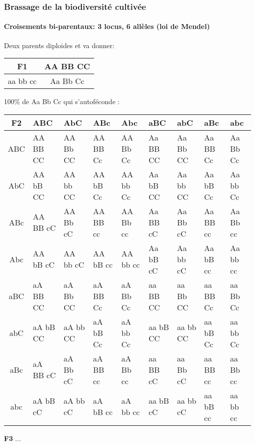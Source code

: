 \begin{frame}
\frametitle{Brassage de la biodiversité cultivée}
\framesubtitle{Croisements bi-parentaux: 3 locus, 6 allèles (loi de Mendel)}

\begin{center}

Deux parents diploides  et  va donner:

\begin{tabular}{|c|c|}
\hline
\textbf{F1} & AA BB CC \\
\hline
aa bb cc & Aa Bb Cc \\
\hline
\end{tabular}

\vspace{.5cm}

100\% de Aa Bb Cc qui s'autoféconde : \\

\tiny
\begin{tabular}{|
c|
p{}|
p{}|
p{}|
p{}|
p{}|
p{}|
p{}|
p{}|}
\hline
\textbf{\normalsize F2}& ABC & AbC & ABc & Abc & aBC & abC & aBc & abc \\
\hline
ABC & \cellcolor{mln-green} AA BB CC & AA Bb CC & AA BB Cc & AA Bb Cc & Aa BB CC & Aa Bb CC & Aa BB Cc & Aa Bb Cc \\
AbC & AA bB CC & AA bb CC & AA bB Cc & AA bb Cc & Aa bB CC & Aa bb CC & Aa bB Cc & Aa bb Cc \\
ABc & AA BB cC & AA Bb cC & AA BB cc & AA Bb cc & Aa BB cC & Aa Bb cC & Aa BB cc & Aa Bb cc \\
Abc & AA bB cC & AA bb cC & AA bB cc & AA bb cc & Aa bB cC & Aa bb cC & Aa bB cc & Aa bb cc \\
aBC & aA BB CC & aA Bb CC & aA BB Cc & aA Bb Cc & aa BB CC & aa Bb CC & aa BB Cc & aa Bb Cc \\
abC & aA bB CC & aA bb CC & aA bB Cc & aA bb Cc & aa bB CC & aa bb CC & aa bB Cc & aa bb Cc \\
aBc & aA BB cC & aA Bb cC & aA BB cc & aA Bb cc & aa BB cC & aa Bb cC & aa BB cc & aa Bb cc \\
abc & aA bB cC & aA bb cC & aA bB cc & aA bb cc & aa bB cC & aa bb cC & aa bB cc & \cellcolor{mln-green} aa bb cc \\
\hline
\end{tabular}

\vspace{.5cm}

\normalsize\textbf{F3} ...


\end{center}

\end{frame}

